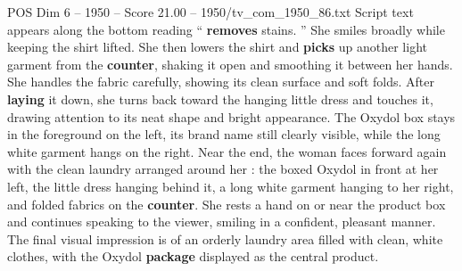 \begin{textsample}{POS Dim 6 – 1950 – Score 21.00 – 1950/tv\_com\_1950\_86.txt}
Script text appears along the bottom reading “ \textbf{removes} stains. ” She smiles broadly while keeping the shirt lifted.
She then lowers the shirt and \textbf{picks} up another light garment from the \textbf{counter}, shaking it open and smoothing it between her hands.
She handles the fabric carefully, showing its clean surface and soft folds.
After \textbf{laying} it down, she turns back toward the hanging little dress and touches it, drawing attention to its neat shape and bright appearance.
The Oxydol box stays in the foreground on the left, its brand name still clearly visible, while the long white garment hangs on the right.
Near the end, the woman faces forward again with the clean laundry arranged around her : the boxed Oxydol in front at her left, the little dress hanging behind it, a long white garment hanging to her right, and folded fabrics on the \textbf{counter}.
She rests a hand on or near the product box and continues speaking to the viewer, smiling in a confident, pleasant manner.
The final visual impression is of an orderly laundry area filled with clean, white clothes, with the Oxydol \textbf{package} displayed as the central product.

\end{textsample}
